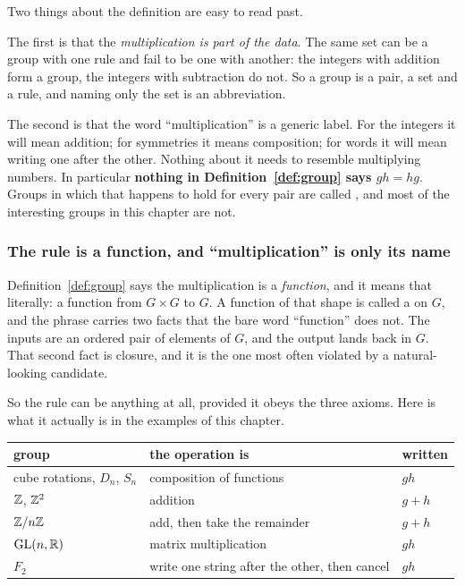 Two things about the definition are easy to read past.

The first is that the \emph{multiplication is part of the data}. The same set can be a group with
one rule and fail to be one with another: the integers with addition form a group, the integers
with subtraction do not. So a group is a pair, a set and a rule, and naming only the set is an
abbreviation.

The second is that the word ``multiplication'' is a generic label. For the integers it will mean
addition; for symmetries it means composition; for words it will mean writing one after the other.
Nothing about it needs to resemble multiplying numbers. In particular \textbf{nothing in
Definition~\ref{def:group} says $gh=hg$}. Groups in which that happens to hold for every pair are
called , and most of the interesting groups in this chapter are not.

\subsubsection*{The rule is a function, and ``multiplication'' is only its name}

Definition~\ref{def:group} says the multiplication is a \emph{function}, and it means that
literally: a function from $G\times G$ to $G$. A function of that shape is called a  on $G$, and the phrase carries two facts that the bare word ``function'' does not. The
inputs are an ordered pair of elements of $G$, and the output lands back in $G$. That second fact
is closure, and it is the one most often violated by a natural-looking candidate.

So the rule can be anything at all, provided it obeys the three axioms. Here is what it actually is
in the examples of this chapter.

\begin{center}
\small
\begin{tabular}{@{}lll@{}}
\toprule
group & the operation is & written\\
\midrule
cube rotations, $D_n$, $S_n$ & composition of functions & $gh$\\
$\mathbb{Z}$, $\mathbb{Z}^2$ & addition & $g+h$\\
$\mathbb{Z}/n\mathbb{Z}$ & add, then take the remainder & $g+h$\\
$\mathrm{GL}(n,\mathbb{R})$ & matrix multiplication & $gh$\\
$F_2$ & write one string after the other, then cancel & $gh$\\
\bottomrule
\end{tabular}
\end{center}

